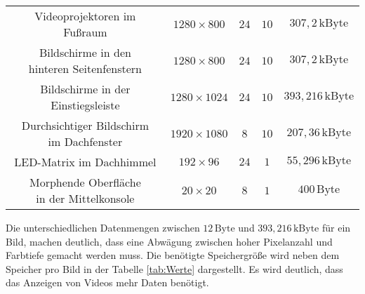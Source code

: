 \begin{table}[hbt]
\begin{tabular}{c|cccc}
		\parbox[t]{0.3\linewidth}{\centering Videoprojektoren im Fußraum} & $ 1280 \times 800 $ & $ 24 $ & $ 10 $ & $ 307,2\,\mathrm{kByte} $ \\
		\parbox[t]{0.3\linewidth}{\centering Bildschirme in den\\hinteren Seitenfenstern} & $ 1280 \times 800 $ & $ 24 $ & $ 10 $ & $ 307,2\,\mathrm{kByte} $ \\
		\parbox[t]{0.3\linewidth}{\centering Bildschirme in der Einstiegsleiste} &  $ 1280 \times 1024 $ & $ 24 $ & $ 10 $ & $ 393,216\,\mathrm{kByte} $ \\
		\parbox[t]{0.3\linewidth}{\centering Durchsichtiger Bildschirm\\im Dachfenster} & $ 1920 \times 1080 $ & $ 8 $ & $ 10 $ & $ 207,36\,\mathrm{kByte} $ \\
		\parbox[t]{0.3\linewidth}{\centering LED-Matrix im Dachhimmel} & $ 192 \times 96 $ & $ 24 $ & $ 1 $ & $ 55,296\,\mathrm{kByte} $ \\
		\parbox[t]{0.3\linewidth}{\centering Morphende Oberfläche\\in der Mittelkonsole} & $ 20 \times 20 $ & $ 8 $ & $ 1 $ & $ 400\,\mathrm{Byte} $ \\
	\end{tabular} 
\end{table}
Die unterschiedlichen Datenmengen zwischen $ 12\,\mathrm{Byte} $ und $ 393,216\,\mathrm{kByte} $ für ein Bild, machen deutlich, dass eine Abwägung zwischen hoher Pixelanzahl und Farbtiefe gemacht werden muss. Die benötigte Speichergröße wird neben dem Speicher pro Bild in der Tabelle \ref{tab:Werte} dargestellt. Es wird deutlich, dass das Anzeigen von Videos mehr Daten benötigt.
